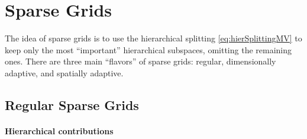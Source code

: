 \section{Sparse Grids}
\label{sec:23sparseGrids}

The idea of sparse grids is to use the
hierarchical splitting \eqref{eq:hierSplittingMV}
to keep only the most ``important'' hierarchical subspaces,
omitting the remaining ones.
There are three main ``flavors'' of sparse grids:
regular, dimensionally adaptive, and spatially adaptive.



\subsection{Regular Sparse Grids}
\label{sec:231regularSG}

\paragraph{Hierarchical contributions}

